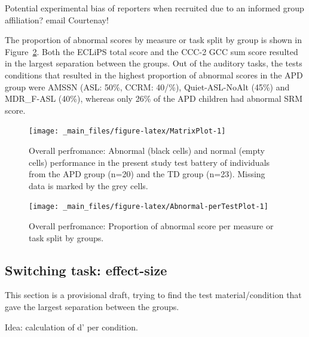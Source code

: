 \documentclass[a4paper, twoside]{templates/ociamthesis}
\begin{document}
\begin{correction}
{Potential experimental bias of reporters when recruited due to an
informed group affiliation? email Courtenay!}
\end{correction}

\hfill\break
The proportion of abnormal scores by measure or task split by group is shown in Figure~\ref{fig:Abnormal-perTestPlot}. Both the ECLiPS total score and the CCC-2 GCC sum score resulted in the largest separation between the groups. Out of the auditory tasks, the tests conditions that resulted in the highest proportion of abnormal scores in the APD group were AMSSN (ASL: 50\%, CCRM: 40/\%), Quiet-ASL-NoAlt (45\%) and MDR\_F-ASL (40\%), whereas only 26\% of the APD children had abnormal SRM score.\\

\begin{figure}

{\centering \texttt{[image: \_main\_files/figure-latex/MatrixPlot-1]} 

}

\caption{Overall perfromance: Abnormal (black cells) and normal (empty cells) performance in the present study test battery of individuals from the APD group (n=20) and the TD group (n=23). Missing data is marked by the grey cells.}\label{fig:MatrixPlot}
\end{figure}

\begin{figure}

{\centering \texttt{[image: \_main\_files/figure-latex/Abnormal-perTestPlot-1]} 

}

\caption{Overall perfromance: Proportion of abnormal score per measure or task split by groups.}\label{fig:Abnormal-perTestPlot}
\end{figure}

\hypertarget{switching-task-effect-size}{%
\subsection{Switching task: effect-size}\label{switching-task-effect-size}}

\begin{correction}
This section is a provisional draft, trying to find the test
material/condition that gave the largest separation between the groups.

Idea: calculation of d' per condition.
\end{correction}
\end{document}
